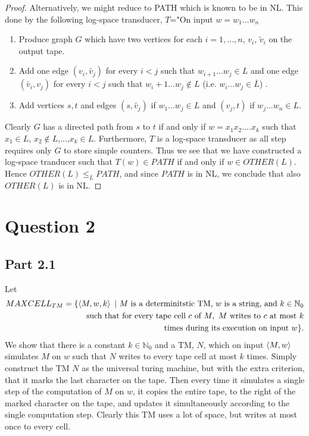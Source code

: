 \documentclass[a4paper,11pt]{article}
\newcommand{\N}{\mathbb{N}}
\newcommand{\pipe}{\ \vert \ }
\numberwithin{equation}{section}
\begin{document}
\begin{proof}
		Alternatively, we might reduce to PATH which is known to be in NL. This done by the following log-space transducer, $ T $="On input $ w=w_1...w_n $\begin{enumerate}
			\item Produce graph $ G $ which have two vertices for each $ i=1,...,n $, $ v_i $, $ \tilde{v}_i $ on the output tape.
			\item Add one edge $ (v_i,\tilde{v_j}) $ for every $ i<j $ such that $ w_{i+1}...w_j\in L $ and one edge $ (\tilde{v_i},v_j) $ for every $ i<j $ such that $ w_i+1...w_j\notin L $ (i.e. $ w_i...w_j\in \overline{L} $) .
			\item Add vertices $ s,t $ and edges $ (s,\tilde{v_j}) $ if $ w_1...w_j\in L $ and $ (v_j,t) $ if $ w_j...w_n\in L $.
		\end{enumerate}
		Clearly $ G $ has a directed path from $ s $ to $ t $ if and only if $ w=x_1x_2....x_k $ such that $ x_1\in L $, $ x_2\notin L $,...,$ x_k\in L $. Furthermore, $ T $ is a log-space transducer as all step requires only $ G $ to store simple counters. Thus we see that we have constructed a log-space tranducer such that $ T(w)\in PATH $ if and only if $ w\in OTHER(L) $. Hence $ OTHER(L)\leq_L PATH $, and since $ PATH $ is in NL, we conclude that also $ OTHER(L) $ is in NL.
	\end{proof}
	
	
	\section*{Question 2}
	\subsection*{Part 2.1}
	Let \begin{equation*}
	\begin{aligned}
	MAXCELL_{TM}=\{\braket{M,w,k}\pipe M\text{ is a determinitstic TM, }w\text{ is a string, and }k\in \N_0\\ \text{ such that for every tape cell }c\text{ of }M,\ M\text{ writes to }c\text{ at most }k\\\text{ times during its execution on input }w\}.
	\end{aligned}
	\end{equation*}
	We show that there is a constant $ k\in\N_0 $ and a TM, $ N $, which on input $ \braket{M,w} $ simulates $ M $ on $ w $ such that $ N $ writes to every tape cell at most $ k $ times. Simply construct the TM $ N $ as the universal turing machine, but with the extra criterion, that it marks the last character on the tape. Then every time it simulates a single step of the computation of $ M $ on $ w $, it copies the entire tape, to the right of the marked character on the tape, and updates it simultaneously according to the single computation step. Clearly this TM uses a lot of space, but writes at most once to every cell. 
	
\end{document}
